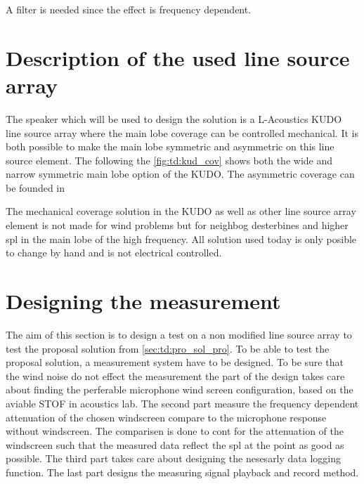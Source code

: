 A filter is needed since the effect is frequency dependent.


\section{Description of the used line source array}

 The speaker which will be used to design the solution is a L-Acoustics KUDO line source array where the main lobe coverage can be controlled mechanical. It is both possible to make the main lobe symmetric and asymmetric on this line source element. The following the \autoref{fig:td:kud_cov} shows both the wide and narrow symmetric main lobe option of the KUDO. The asymmetric coverage can be founded in \citep{KUDO_data}


The mechanical coverage solution in the KUDO as well as other line source array element is not made for wind problems but for neighbog desterbines and higher \gls{spl} in the main lobe of the high frequency. All solution used today is only posible to change by hand and is not electrical controlled. 





\section{Designing the measurement}

The aim of this section is to design a test on a non modified line source array to test the proposal solution from \autoref{sec:td:pro_sol_pro}. To be able to test the proposal solution, a measurement system have to be designed. To be sure that the wind noise do not effect the measurement the part of the design takes care about finding the perferable microphone wind screen configuration, based on the aviable STOF in acoustics lab. The second part measure the frequency dependent attenuation of the chosen windscreen compare to the microphone response without windscreen. The comparisen is done to cont for the attenuation of the windscreen such that the measured data reflect the \gls{spl} at the point as good as possible. The third part takes care about designing the nesesarly data logging function. The last part designs the measuring signal playback and record method.


